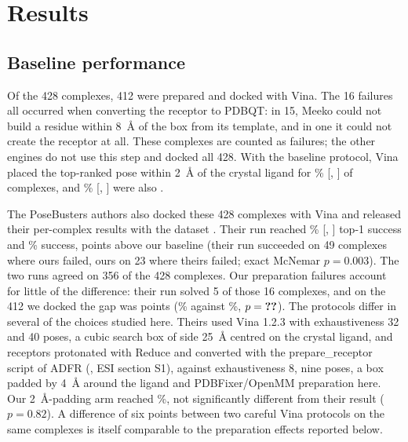 \section{Results}
\label{sec:results}


\subsection{Baseline performance}

Of the 428 complexes, 412 were prepared and docked with Vina. The 16 failures all occurred
when converting the receptor to PDBQT: in 15, Meeko could not build a residue within
\SI{8}{\angstrom} of the box from its template, and in one it could not create the receptor
at all. These
complexes are counted as failures; the other engines do not use this step and docked all
428. With the baseline protocol, Vina placed the top-ranked pose within \SI{2}{\angstrom} of
the crystal ligand for \% [, ] of complexes, and \% [, ] were also
\pbvalid{}.

The PoseBusters authors also docked these 428 complexes with Vina and released their
per-complex results with the dataset \citep{posebusters2023data}. Their run reached \%
[, ] top-1 success and \% \pbvalid{} success,  points above our baseline
(their run succeeded on 49 complexes where ours failed, ours on 23 where theirs failed;
exact McNemar $p = 0.003$). The two runs agreed on 356 of the 428 complexes. Our
preparation failures account for little of the difference: their run solved 5 of those 16
complexes, and on the 412 we docked the gap was  points (\% against \%,
$p = \val{posebusters_published/docked/p}$). The protocols differ in several of the choices studied here. Theirs used Vina
1.2.3 with exhaustiveness 32 and 40 poses, a cubic search box of side \SI{25}{\angstrom}
centred on the crystal ligand, and receptors protonated with Reduce \citep{word1999reduce}
and converted with the prepare\_receptor script of ADFR \citep{ravindranath2015autodockfr}
(\citealp{buttenschoen2024posebusters}, ESI section S1), against exhaustiveness 8, nine
poses, a box
padded by \SI{4}{\angstrom} around the ligand and PDBFixer/OpenMM preparation here. Our
\SI{2}{\angstrom}-padding arm reached \%, not significantly different from their result
($p = 0.82$). A difference of six points between two careful Vina protocols on the same
complexes is itself comparable to the preparation effects reported below.

